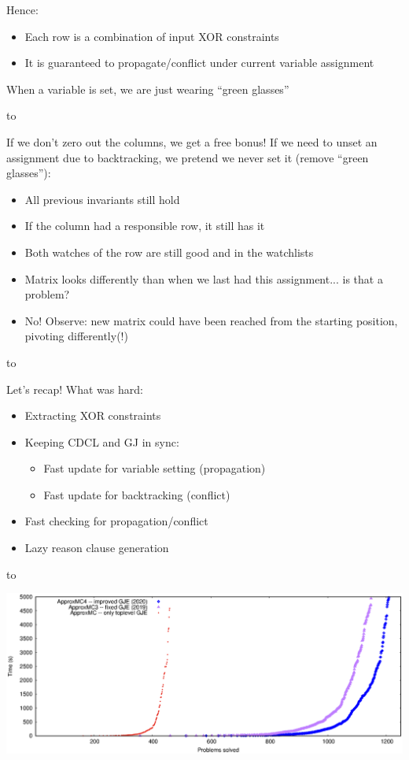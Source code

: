 \documentclass[aspectratio=196]{slides}
\def\TITLE#1{\hbox to \linewidth{\large #1\hfill}}
\def\BOTTOM{\vfill\newpage}
\def\SLIDE#1{\BOTTOM\TITLE{#1}}
\begin{document}
Hence:
\begin{itemize}
\item Each row is a combination of input XOR constraints
\item It is guaranteed to propagate/conflict under current variable assignment
\end{itemize}

When a variable is set, we are just wearing ``green glasses''

\vfill
\newpage
\SLIDE{CDCL(T) Gauss-Jordan Elimination: Backtracking}
\vspace{2ex}


If we don't zero out the columns, we get a free bonus! If we need to unset an assignment due to backtracking, we pretend we never set it (remove ``green glasses''):
\begin{itemize}
\item All previous invariants still hold
\item If the column had a responsible row, it still has it
\item Both watches of the row are still good and in the watchlists
\item Matrix looks differently than when we last had this assignment... is that a problem?
\item No! Observe: new matrix could have been reached from the starting position, pivoting differently(!)
\end{itemize}
\vfill
\newpage
\SLIDE{CDCL(T) Gauss-Jordan Elimination: Recap}
\vspace{2ex}

Let's recap! What was hard:
\begin{itemize}
\item Extracting XOR constraints
\item Keeping CDCL and GJ in sync:
\begin{itemize}
\item Fast update for variable setting (propagation)
\item Fast update for backtracking (conflict)
\end{itemize}
\item Fast checking for propagation/conflict
\item Lazy reason clause generation
\end{itemize}

\vfill
\newpage
\SLIDE{Thank you!}
\vspace{2ex}

\begin{center}
\includegraphics[scale=1.4]{appmc-mate-presentation}
\end{center}

\vfill
\newpage
\end{document}
